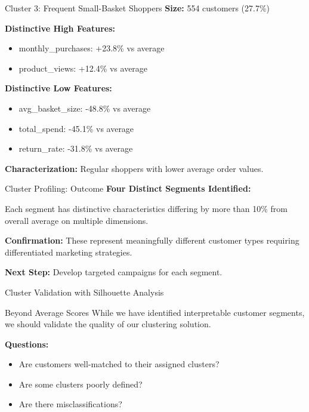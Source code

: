 \documentclass[aspectratio=169,ignorenonframetext]{beamer}
\begin{document}
\begin{frame}{Cluster 3: Frequent Small-Basket Shoppers}
\textbf{Size:} 554 customers (27.7\%)

\textbf{Distinctive High Features:}

\begin{itemize}
\item
  monthly\_purchases: +23.8\% vs average
\item
  product\_views: +12.4\% vs average
\end{itemize}

\textbf{Distinctive Low Features:}

\begin{itemize}
\item
  avg\_basket\_size: -48.8\% vs average
\item
  total\_spend: -45.1\% vs average
\item
  return\_rate: -31.8\% vs average
\end{itemize}

\textbf{Characterization:} Regular shoppers with lower average order
values.
\end{frame}

\begin{frame}{Cluster Profiling: Outcome}
\textbf{Four Distinct Segments Identified:}

Each segment has distinctive characteristics differing by more than 10\%
from overall average on multiple dimensions.

\textbf{Confirmation:} These represent meaningfully different customer
types requiring differentiated marketing strategies.

\textbf{Next Step:} Develop targeted campaigns for each segment.
\end{frame}

\begin{frame}{Cluster Validation with Silhouette Analysis}
\begin{block}{Beyond Average Scores}
While we have identified interpretable customer segments, we should
validate the quality of our clustering solution.

\textbf{Questions:}

\begin{itemize}
\item
  Are customers well-matched to their assigned clusters?
\item
  Are some clusters poorly defined?
\item
  Are there misclassifications?
\end{itemize}
\end{block}
\end{frame}
\end{document}
